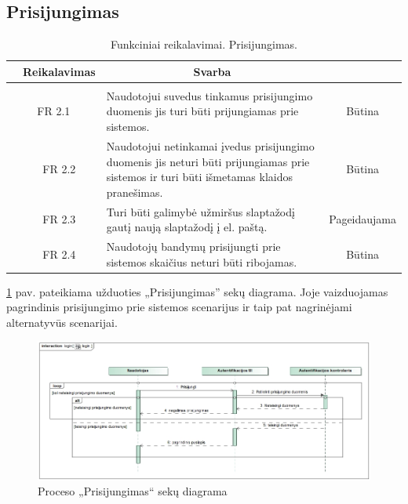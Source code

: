 \documentclass{VUMIFPSkursinis}
\begin{document}
\subsection{Prisijungimas}
	\begin{table}[H]
	\caption{Funkciniai reikalavimai. Prisijungimas.}
	\begin{tabular}{|p{1cm}|p{1cm}|p{}|p{}|}
		\hline 
		\rowcolor{gray!50}
		\multicolumn{2}{|c|}{{\bfseries Kodas}}&
		\multicolumn{1}{c|}{{\bfseries Reikalavimas}}&
		\multicolumn{1}{c|}{{\bfseries Svarba}}\\
		\hline
		\rowcolor{lightgray}
		\multicolumn{4}{|c|}{Prisijungimas}\\		
		
		\hline
		\multicolumn{2}{|c|}{FR 2.1}&
		{Naudotojui suvedus tinkamus prisijungimo duomenis jis turi būti prijungiamas prie sistemos.
		}&		
		\multicolumn{1}{c|}{Būtina}\\
		\hline
		\multicolumn{1}{|c}{}&
		\multicolumn{1}{c|}{FR 2.2}&
		{Naudotojui netinkamai įvedus prisijungimo duomenis jis neturi būti prijungiamas prie sistemos ir turi būti išmetamas klaidos pranešimas.
		}&		
		\multicolumn{1}{c|}{Būtina}\\
		\hline
		\multicolumn{1}{|c}{}&
		\multicolumn{1}{c|}{FR 2.3}&
		{Turi būti galimybė užmiršus slaptažodį gautį naują slaptažodį į el. paštą.
		}&
		\multicolumn{1}{c|}{Pageidaujama}\\	
		\hline		
		\multicolumn{1}{|c}{}&
		\multicolumn{1}{c|}{FR 2.4}&
		{Naudotojų bandymų prisijungti prie sistemos skaičius neturi būti ribojamas.
		}&
		\multicolumn{1}{c|}{Būtina}\\									
		\hline
	\end{tabular}		
\end{table}
\ref{fig:login} pav. pateikiama užduoties „Prisijungimas” sekų diagrama. Joje vaizduojamas pagrindinis prisijungimo prie sistemos scenarijus ir taip pat nagrinėjami alternatyvūs scenarijai.
\begin{figure}[H]
	\centering
	\includegraphics[width=\linewidth]{img/login.jpg}
	\caption{Proceso „Prisijungimas“ sekų diagrama}
	\label{fig:login}
\end{figure}
\end{document}
